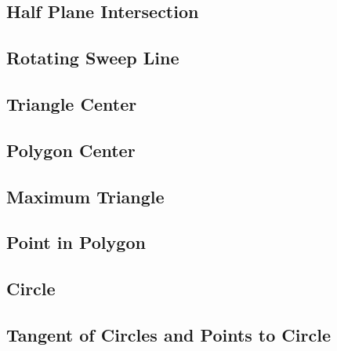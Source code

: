 \documentclass[a4paper,10pt,twocolumn,oneside]{article}
\begin{document}
\subsection{Half Plane Intersection}

\subsection{Rotating Sweep Line}

\subsection{Triangle Center}

\subsection{Polygon Center}

\subsection{Maximum Triangle}

\subsection{Point in Polygon}

% 
% 
% 
\subsection{Circle}

\subsection{Tangent of Circles and Points to Circle}

\end{document}
